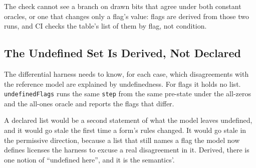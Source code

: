 \documentclass[runningheads]{llncs}
\newcommand{\src}[1]{}  %
\newcommand{\lean}[1]{\texttt{#1}}
\begin{document}
\src{X86/Serialize.lean undefinedLeaked (the oracle cursor clause); docs/CLAIMS.tsv[diff\_cases, diff\_leaks]; docs/CURSOR-LEAK-CHECK-2026-09-13.md, ``emitted 1012 vectors x 88 pre-states = 89056 cases'', a Lean-only run without ACL2, and the cursor-plant line and the 84-vs-88 pre-state note (D250); docs/CLAIMS.tsv[cursor\_cases, cursor\_leaks, cursor\_plant\_fired, cursor\_plant\_cases, cursor\_walk\_prestates]; X86/Serialize.lean
undefinedLeakedBy; Main.lean wrongDrawCountReadsDrawnBit; docs/DECISIONS.md D226}
The check cannot see a branch on drawn bits that agree under both constant oracles, or one that changes only a
flag's value: flags are derived from those two runs, and CI checks the table's list of them by flag, not condition.
\src{Main.lean checkUndefinedColumn (a row naming a flag the model never draws over-claims, one missing a drawn flag under-claims) and the
comment above undefinedColumnTokens (``A row could still carry a wrong CONDITION''); .github/workflows/ci.yml, the undefined-column step (D226);
docs/DECISIONS.md D213 4 for the two-constant-oracle precondition}

\subsection{The Undefined Set Is Derived, Not Declared}
\label{sec:undef:derived}

The differential harness needs to know, for each case, which disagreements with the reference model are
explained by undefinedness. For flags it holds no list. \lean{undefinedFlags} runs the same
\lean{step} from the same pre-state under the all-zeros and the all-ones oracle and reports the flags
that differ.
\src{X86/Serialize.lean undefinedFlags; docs/DECISIONS.md D6}
A declared list would be a second statement of what the model leaves undefined, and it would go stale
the first time a form's rules changed. It would go stale in the permissive direction, because a list
that still names a flag the model now defines licenses the harness to excuse a real disagreement in it.
Derived, there is one notion of ``undefined here'', and it is the semantics'.
\end{document}
